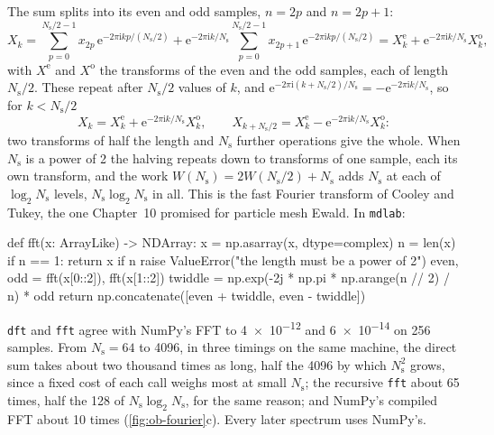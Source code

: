 The sum splits into its even and odd samples, $n = 2p$ and $n = 2p + 1$:
\begin{equation*}
   X_k = \sum_{p=0}^{N_{\mathrm s}/2-1}x_{2p}\,\mathrm{e}^{-2\pi\mathrm{i}kp/(N_{\mathrm s}/2)}
   + \mathrm{e}^{-2\pi\mathrm{i}k/N_{\mathrm s}}\sum_{p=0}^{N_{\mathrm s}/2-1}x_{2p+1}\,
   \mathrm{e}^{-2\pi\mathrm{i}kp/(N_{\mathrm s}/2)}
   = X^{\mathrm e}_k + \mathrm{e}^{-2\pi\mathrm{i}k/N_{\mathrm s}}
   X^{\mathrm o}_k ,
\end{equation*}
with $X^{\mathrm e}$ and $X^{\mathrm o}$ the transforms of the even and the
odd samples, each of length $N_{\mathrm s}/2$. These repeat after $N_{\mathrm s}/2$ values of $k$,
and $\mathrm{e}^{-2\pi\mathrm{i}(k + N_{\mathrm s}/2)/N_{\mathrm s}} =
-\mathrm{e}^{-2\pi\mathrm{i}k/N_{\mathrm s}}$, so for $k < N_{\mathrm s}/2$
\begin{equation*}
   X_k = X^{\mathrm e}_k + \mathrm{e}^{-2\pi\mathrm{i}k/N_{\mathrm s}}
   X^{\mathrm o}_k , \qquad
   X_{k+N_{\mathrm s}/2} = X^{\mathrm e}_k - \mathrm{e}^{-2\pi\mathrm{i}k/N_{\mathrm s}}
   X^{\mathrm o}_k :
\end{equation*}
two transforms of half the length and $N_{\mathrm s}$ further operations
give the whole. When $N_{\mathrm s}$ is a power of 2 the halving repeats
down to transforms of one sample, each its own transform, and the work
$W(N_{\mathrm s}) = 2W(N_{\mathrm s}/2) + N_{\mathrm s}$ adds $N_{\mathrm s}$
at each of $\log_2N_{\mathrm s}$ levels, $N_{\mathrm s}\log_2N_{\mathrm s}$
in all. This is the fast
Fourier transform of Cooley and Tukey\cite{CooleyTukey1965}, the one
Chapter~10 promised for particle mesh Ewald. In \texttt{mdlab}:

\begin{code}
def fft(x: ArrayLike) -> NDArray:
    x = np.asarray(x, dtype=complex)
    n = len(x)
    if n == 1:
        return x
    if n %
        raise ValueError("the length must be a power of 2")
    even, odd = fft(x[0::2]), fft(x[1::2])
    twiddle = np.exp(-2j * np.pi * np.arange(n // 2) / n) * odd
    return np.concatenate([even + twiddle, even - twiddle])
\end{code}

\noindent \texttt{dft} and \texttt{fft} agree with NumPy's FFT to
\num{4e-12} and \num{6e-14} on 256 samples. From $N_{\mathrm s} = 64$ to
4096, in three timings on the same machine, the direct sum takes about two
thousand times as long, half the 4096 by which $N_{\mathrm s}^2$ grows,
since a fixed cost of each call weighs most at small $N_{\mathrm s}$; the
recursive \texttt{fft} about 65 times, half the 128 of $N_{\mathrm
s}\log_2N_{\mathrm s}$, for the same reason; and NumPy's compiled FFT
about 10 times (\cref{fig:ob-fourier}c). Every later spectrum uses NumPy's.

